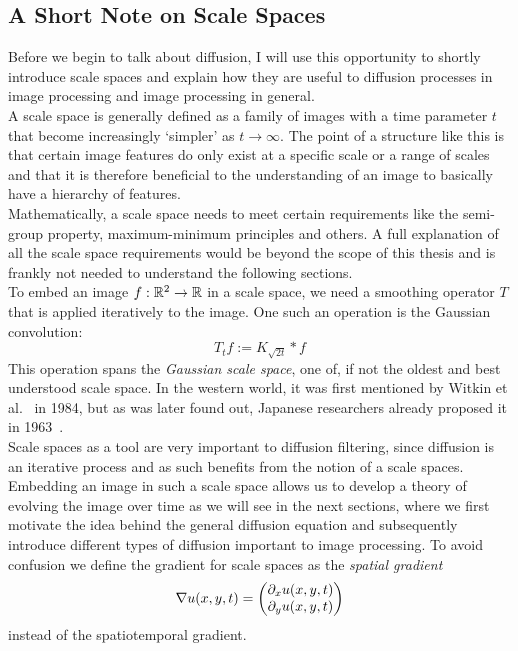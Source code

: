 \subsection{A Short Note on Scale Spaces}\label{sub:ScaleSpaces}
Before we begin to talk about diffusion, I will use this opportunity to shortly introduce scale
spaces and explain how they are useful to diffusion processes in image processing and image
processing in general.\\
A scale space is generally defined as a family of images with a time parameter $t$ that become
increasingly `simpler' as $t \to \infty$. The point of a structure like this is that certain image
features do only exist at a specific scale or a range of scales and that it is therefore beneficial
to the understanding of an image to basically have a hierarchy of features.\\
Mathematically, a scale
space needs to meet certain requirements like the semi-group property, maximum-minimum principles
and others.
A full explanation of all the scale space requirements would be beyond the scope of this thesis
and is frankly not needed to understand the following sections.\\
To embed an image $f:\mathbb{R}^2 \rightarrow \mathbb{R}$ in a scale space, we need a smoothing
operator $T$ that is applied iteratively to the image. One such an operation is the Gaussian
convolution: 
\begin{equation}
    T_{t}f := K_{\sqrt{2t}} * f
\end{equation}
This operation spans the \textit{Gaussian scale space}, one of, if not the oldest and best
understood scale space. In the western world, it was first mentioned by Witkin et
al.~\cite{witkin84} in 1984, but as was later found out, Japanese researchers already proposed it in
1963~\cite{weickert-ishikawa}.\\
Scale spaces as a tool are very important to diffusion filtering, since diffusion is an iterative
process and as such benefits from the notion of a scale spaces. Embedding an image in such a scale
space allows us to develop a theory of evolving the image over time as we will see in the next
sections, where we first motivate the idea behind the general diffusion equation and
subsequently introduce different types of diffusion important to image processing.
To avoid confusion we define the gradient for scale spaces as the \textit{spatial gradient} 
\begin{equation}
    \mathbf{\nabla} u(x, y, t) = \begin{pmatrix}
        \partial_x u(x, y, t)\\
        \partial_y u(x, y, t)
    \end{pmatrix} 
\end{equation}
instead of the spatiotemporal gradient.

